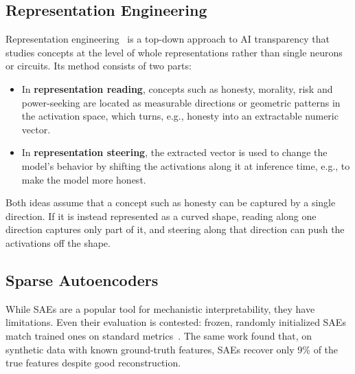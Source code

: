 \documentclass[11pt,a4paper]{article}
\newcommand{\didtodo}{\textbf{\textcolor{blue}{[DID THE TODO]}}\ }
\begin{document}
\subsection{Representation Engineering}
Representation engineering~\cite{zou2023representation} is a top-down approach to AI transparency that studies concepts at the level of whole representations rather than single neurons or circuits. Its method consists of two parts:
\begin{itemize}
    \item In \textbf{representation reading}, concepts such as honesty, morality, risk and power-seeking are located as measurable directions or geometric patterns in the activation space, which turns, e.g., honesty into an extractable numeric vector.
    \item In \textbf{representation steering}, the extracted vector is used to change the model's behavior by shifting the activations along it at inference time, e.g., to make the model more honest.
\end{itemize}
Both ideas assume that a concept such as honesty can be captured by a single direction. If it is instead represented as a curved shape, reading along one direction captures only part of it, and steering along that direction can push the activations off the shape.

\subsection{Sparse Autoencoders}
While SAEs are a popular tool for mechanistic interpretability, they have limitations.
Even their evaluation is contested: frozen, randomly initialized SAEs
match trained ones on standard metrics~\cite{korznikov2026sanity}.
The same work found that, on synthetic data with known ground-truth features, SAEs recover only 9\% of the true features despite good reconstruction.
\end{document}
